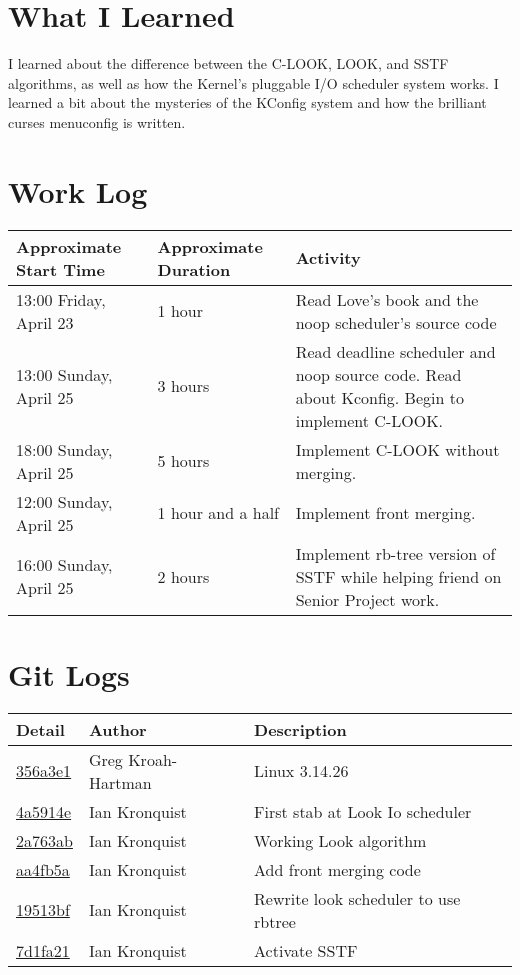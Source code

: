 \documentclass[10pt,conference,draftclsnofoot,onecolumn]{IEEEtran}
\begin{document}
\section{What I Learned}
I learned about the difference between the C-LOOK, LOOK, and SSTF algorithms, as well as how the Kernel's pluggable I/O scheduler system works. I learned a bit about the mysteries of the KConfig system and how the brilliant curses menuconfig is written.


\section{Work Log}
\begin{tabular}{|p{5cm}|p{5cm}|p{5cm}}
    \textbf{Approximate Start Time} & \textbf{Approximate Duration} & \textbf{Activity} \\
    \hline
    13:00 Friday, April 23 & 1 hour & Read Love's book and the noop scheduler's source code \\
    13:00 Sunday, April 25 & 3 hours & Read deadline scheduler and noop source code. Read about Kconfig. Begin to implement C-LOOK.\\
    18:00 Sunday, April 25 & 5 hours & Implement C-LOOK without merging.\\
    12:00 Sunday, April 25 & 1 hour and a half & Implement front merging.\\
    16:00 Sunday, April 25 & 2 hours & Implement rb-tree version of SSTF while helping friend on Senior Project work.\\
\end{tabular}

\bigskip
\bigskip

\section{Git Logs}
\begin{tabular}{l l l}\textbf{Detail} & \textbf{Author} & \textbf{Description}\\
\hline
\href{git://git.yoctoproject.org/linux-yocto-3.14/commit/356a3e1fde11190febb8ace3cdab8694848ed220}{356a3e1} & Greg Kroah-Hartman & Linux 3.14.26\\\hline
\href{git://git.yoctoproject.org/linux-yocto-3.14/commit/4a5914ec16ba75f6d0ca454ebef6ef5bfe244f39}{4a5914e} & Ian Kronquist & First stab at Look Io scheduler\\\hline
\href{git://git.yoctoproject.org/linux-yocto-3.14/commit/2a763aba79ab22989d4a32a0c365919479a8cbe8}{2a763ab} & Ian Kronquist & Working Look algorithm\\\hline
\href{git://git.yoctoproject.org/linux-yocto-3.14/commit/aa4fb5ad6dfbd6f5e9984b47b5cbe315eda7831a}{aa4fb5a} & Ian Kronquist & Add front merging code\\\hline
\href{git://git.yoctoproject.org/linux-yocto-3.14/commit/19513bfbad0a7cc0d04c1b7ae783a96bdc98fe1e}{19513bf} & Ian Kronquist & Rewrite look scheduler to use rbtree\\\hline
\href{git://git.yoctoproject.org/linux-yocto-3.14/commit/7d1fa21a1e4dccf93fba9a1763da5303d97af390}{7d1fa21} & Ian Kronquist & Activate SSTF\\\hline
\end{tabular}


\clearpage
\printbibliography
\end{document}
